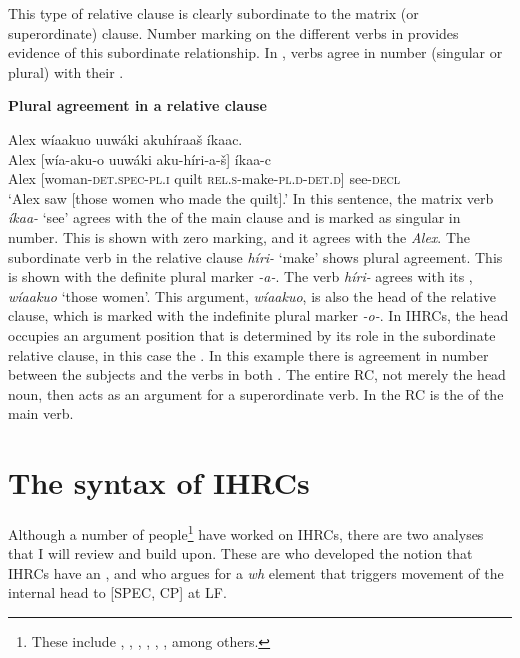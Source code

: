 \documentclass[output=paper]{LSP/langsci}
\begin{document}
This type of relative clause is clearly subordinate to the matrix (or superordinate) clause. Number marking on the different verbs in  provides evidence of this subordinate relationship. In , verbs agree in number (singular or plural) with their .

\ea \textbf{Plural agreement in a  relative clause} \label{boyle12}

\glll Alex {\ob}w\'iaakuo uuwáki akuh\'iraa\v{s}{\cb} \'ikaac.\\
Alex [w\'ia-aku-o    uuwáki  aku-h\'iri-a-\v{s}]  \'ikaa-c\\
Alex [woman-\textsc{det.spec-pl.i} quilt  \textsc{rel.s}-make-\textsc{pl.d}-\textsc{det.d}] see-\textsc{decl}\\
\trans `Alex saw [those women who made the quilt].' 
\z
In this sentence, the matrix verb \textit{\'ikaa-} `see' agrees with the  of the main clause and is marked as singular in number. This is shown with zero marking, and it agrees with the  \textit{Alex}. The subordinate verb in the relative clause \textit{h\'iri-} `make' shows plural agreement. This is shown with the definite plural marker \textit{-a-}.  The verb \textit{h\'iri-} agrees with its , \textit{w\'iaakuo} `those women'. This argument, \textit{w\'iaakuo}, is also the head of the relative clause, which is marked with the indefinite plural marker \textit{-o-}. In IHRCs, the head occupies an argument position that is determined by its role in the subordinate relative clause, in this case the . In this example there is agreement in number between the subjects and the verbs in both . The entire RC, not merely the head noun, then acts as an argument for a superordinate verb. In  the RC is the  of the main verb.

\section{The {syntax} of IHRCs}\label{sec:boyle:4}
\largerpage[-1]

Although a number of people\footnote{These include \citet{HalePlatero1974}, \citet{Gorbet1976}, \citet{Fauconnier1979}, \citet{Cole1987}, \citet{Culy1990}, \citet{Kayne1994} \citet{Bianchi1999}, \citet{Citko2001} among others.} have worked on IHRCs, there are two analyses that I will review and build upon. These are \citet{Williamson1987} who developed the notion that IHRCs have an , and \citet{Culy1990} who argues for a \textit{wh} element that triggers movement of the internal head to [SPEC, CP] at LF.
\end{document}
